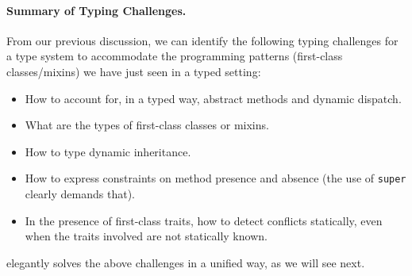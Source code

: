 \paragraph{Summary of Typing Challenges.}
From our previous discussion, we can identify the following typing challenges
for a type system to accommodate the programming patterns (first-class classes/mixins)
we have just seen in a typed setting:
\begin{itemize}
\item How to account for, in a typed way, abstract methods and dynamic dispatch.
\item What are the types of first-class classes or mixins.
\item How to type dynamic inheritance.
\item How to express constraints on method presence and absence (the use of
  \lstinline{super} clearly demands that).
\item In the presence of first-class traits, how to detect conflicts statically,
  even when the traits involved are not statically known.
\end{itemize}
\sedel elegantly solves the above challenges in a unified way, as
we will see next.





